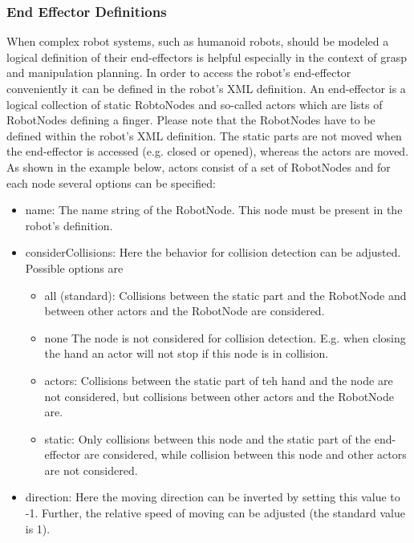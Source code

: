 \subsubsection{End Effector Definitions}
When complex robot systems, such as humanoid robots, should be modeled a logical definition of their end-effectors is helpful especially in the context of grasp and manipulation planning. In order to access the robot's end-effector conveniently it can be defined in the robot's XML definition. An end-effector is a logical collection of static RobtoNodes and so-called actors which are lists of RobotNodes defining a finger. Please note that the RobotNodes have to be defined within the robot's XML definition. The static parts are not moved when the end-effector is accessed (e.g. closed or opened), whereas the actors are moved. As shown in the example below, actors consist of a set of RobotNodes and for each node several options can be specified:
\begin{itemize}
  \item name: The name string of the RobotNode. This node must be present in the robot's definition. 
  \item considerCollisions: Here the behavior for collision detection can be adjusted. Possible options are 
  \begin{itemize}
    \item all (standard): Collisions between the static part and the RobotNode and between other actors and the RobotNode are considered. 
    \item none The node is not considered for collision detection. E.g. when closing the hand an actor will not stop if this node is in collision. 
    \item actors: Collisions between the static part of teh hand and the node are not considered, but collisions between other actors and the RobotNode are. 
    \item static: Only collisions between this node and the static part of the end-effector are considered, while collision between this node and other actors are not considered. 
  \end{itemize}

  \item direction: Here the moving direction can be inverted by setting this value to -1. Further, the relative speed of moving can be adjusted (the standard value is 1). 

\end{itemize}
